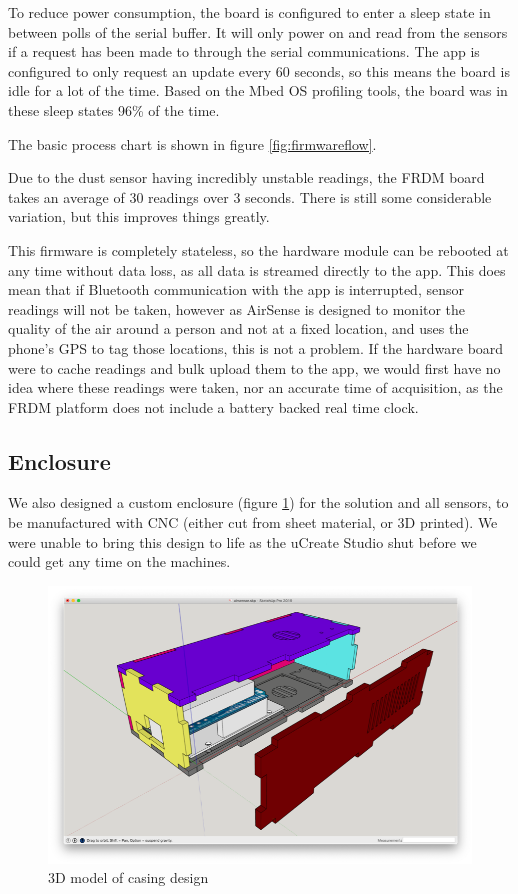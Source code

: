 \documentclass[sigconf, nonacm]{acmart}
\begin{document}
To reduce power consumption, the board is configured to enter a sleep state in between polls
of the serial buffer. It will only power on and read from the sensors if a request has been
made to through the serial communications. The app is configured to only request an update 
every 60 seconds, so this means the board is idle for a lot of the time. Based on the Mbed OS 
profiling tools, the board was in these sleep states 96\% of the time.

The basic process chart is shown in figure \ref{fig:firmwareflow}.

Due to the dust sensor having incredibly unstable readings, the FRDM board takes an average of
30 readings over 3 seconds. There is still some considerable variation, but this improves 
things greatly.

This firmware is completely stateless, so the hardware module can be rebooted at any time
without data loss, as all data is streamed directly to the app. This does mean that if
Bluetooth communication with the app is interrupted, sensor readings will not be taken,
however as AirSense is designed to monitor the quality of the air around a person and not
at a fixed location, and uses the phone's GPS to tag those locations, this is not a problem. 
If the hardware board were to cache readings and bulk upload them to the app, we would first
have no idea where these readings were taken, nor an accurate time of acquisition, as the 
FRDM platform does not include a battery backed real time clock.

\subsection{Enclosure}

We also designed a custom enclosure (figure \ref{fig:casing}) for the solution and all sensors, to be manufactured
with CNC (either cut from sheet material, or 3D printed). We were unable to bring this
design to life as the uCreate Studio shut before we could get any time on the machines.

\begin{figure}
	\includegraphics[width=\columnwidth]{casing}
	\caption{3D model of casing design}
	\label{fig:casing}
\end{figure}
\end{document}
